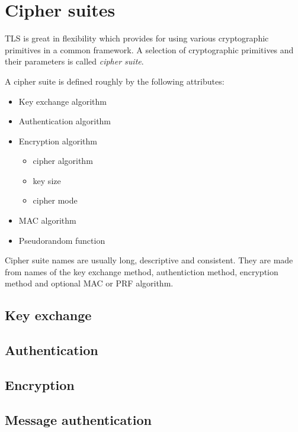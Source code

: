 \section{Cipher suites}

TLS is great in flexibility which provides for using various cryptographic primitives in a common framework. A selection of cryptographic primitives and their parameters is called \textit{cipher suite}.

A cipher suite is defined roughly by the following attributes:

\begin{itemize}
  \item Key exchange algorithm
  \item Authentication algorithm
  \item Encryption algorithm
  \begin{itemize}
    \item cipher algorithm
    \item key size
    \item cipher mode
  \end{itemize}
  \item MAC algorithm
  \item Pseudorandom function
\end{itemize}

Cipher suite names are usually long, descriptive and consistent. They are made from names of the key exchange method, authentiction method, encryption method and optional MAC or PRF algorithm.

\subsection{Key exchange}

\subsection{Authentication}

\subsection{Encryption}

\subsection{Message authentication}
